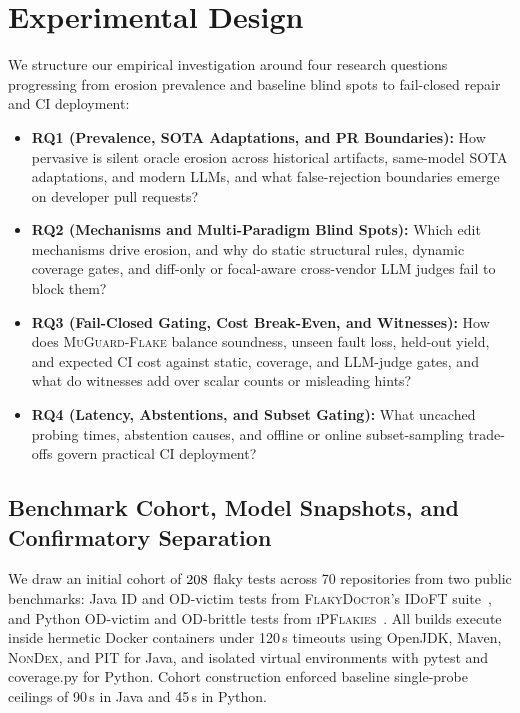 \section{Experimental Design}
\label{sec:design}

We structure our empirical investigation around four research questions progressing from erosion prevalence and baseline blind spots to fail-closed repair and CI deployment:
\begin{itemize}[nosep]
    \item \textbf{RQ1 (Prevalence, SOTA Adaptations, and PR Boundaries):} How pervasive is silent oracle erosion across historical artifacts, same-model SOTA adaptations, and modern LLMs, and what false-rejection boundaries emerge on developer pull requests?
    \item \textbf{RQ2 (Mechanisms and Multi-Paradigm Blind Spots):} Which edit mechanisms drive erosion, and why do static structural rules, dynamic coverage gates, and diff-only or focal-aware cross-vendor LLM judges fail to block them?
    \item \textbf{RQ3 (Fail-Closed Gating, Cost Break-Even, and Witnesses):} How does \textsc{MuGuard-Flake} balance soundness, unseen fault loss, held-out yield, and expected CI cost against static, coverage, and LLM-judge gates, and what do witnesses add over scalar counts or misleading hints?
    \item \textbf{RQ4 (Latency, Abstentions, and Subset Gating):} What uncached probing times, abstention causes, and offline or online subset-sampling trade-offs govern practical CI deployment?
\end{itemize}

\subsection{Benchmark Cohort, Model Snapshots, and Confirmatory Separation}

We draw an initial cohort of $208$ flaky tests across 70 repositories from two public benchmarks: Java ID and OD-victim tests from \textsc{FlakyDoctor}'s \textsc{IDoFT} suite~\cite{chen2024flakydoctor}, and Python OD-victim and OD-brittle tests from \textsc{iPFlakies}~\cite{wang2022ipflakies}. All builds execute inside hermetic Docker containers under 120\,s timeouts using OpenJDK, Maven, \textsc{NonDex}, and PIT for Java, and isolated virtual environments with pytest and coverage.py for Python. Cohort construction enforced baseline single-probe ceilings of 90\,s in Java and 45\,s in Python.


